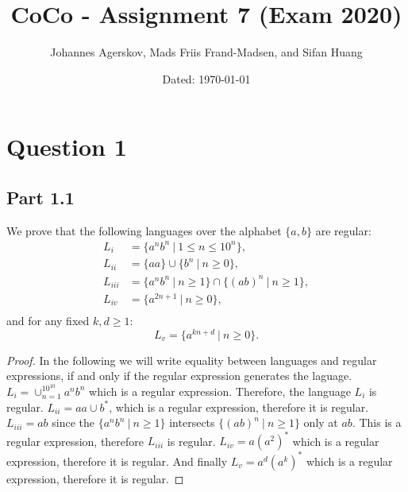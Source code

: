 \documentclass[a4paper,11pt]{article}
\author{Johannes Agerskov, Mads Friis Frand-Madsen, and Sifan Huang}
\date{Dated: \today}
\title{CoCo - Assignment 7 (Exam 2020)}
\newcommand{\pipe}{\ \vert \ }
\numberwithin{equation}{section}
\begin{document}
	
	\maketitle
	\section*{Question 1}
	\subsection*{Part 1.1}
	We prove that the following languages over the alphabet $ \{a,b\} $ are regular:\begin{equation}
		\begin{aligned}
		L_i&=\{a^nb^n\pipe1\leq n\leq 10^n\},\\
		L_{ii}&=\{aa\}\cup\{b^n\pipe n\geq 0\},\\
		L_{iii}&=\{a^nb^n\pipe n\geq1\}\cap\{(ab)^n\pipe n\geq 1\},\\
		L_{iv}&=\{a^{2n+1}\pipe n\geq0\},\\
		\end{aligned}
	\end{equation}
	and for any fixed $ k,d\geq1 $:
	\begin{equation*}
		L_{v}=\{a^{kn+d}\pipe n\geq0\}.
	\end{equation*}
	\begin{proof}In the following we will write equality between languages and regular expressions, if and only if the regular expression generates the laguage.
		$ L_i=\cup_{n=1}^{10^{10}}a^nb^n $ which is a regular expression. Therefore, the language $ L_i $ is regular. $ L_{ii}=aa\cup b^* $, which is a regular expression, therefore it is regular. $ L_{iii}=ab $ since the $ \{a^nb^n\pipe n\geq1\} $ intersects $ \{(ab)^n\pipe n\geq 1\} $ only at $ ab $. This is a regular expression, therefore $ L_{iii} $ is regular. $ L_{iv}=a(a^2)^* $ which is a regular expression, therefore it is regular. And finally $ L_v=a^d(a^k)^* $ which is a regular expression, therefore it is regular.
	\end{proof}
	
	
\end{document}
